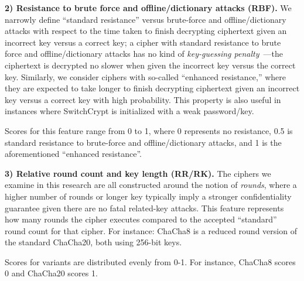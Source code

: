 \textbf{2) Resistance to brute force and offline/dictionary attacks (RBF).} We
narrowly define ``standard resistance'' versus brute-force and
offline/dictionary attacks with respect to the time taken to finish decrypting
ciphertext given an incorrect key versus a correct key; a cipher with standard
resistance to brute force and offline/dictionary attacks has no kind of
\emph{key-guessing penalty}~\cite{Freestyle}---the ciphertext is decrypted no
slower when given the incorrect key versus the correct key. Similarly, we
consider ciphers with so-called ``enhanced resistance,'' where they are expected
to take longer to finish decrypting ciphertext given an incorrect key versus a
correct key with high probability. This property is also useful in instances
where SwitchCrypt is initialized with a weak password/key.

Scores for this feature range from 0 to 1, where 0 represents no resistance, 0.5
is standard resistance to brute-force and offline/dictionary attacks, and 1 is
the aforementioned ``enhanced resistance''.

\textbf{3) Relative round count and key length (RR/RK).} The ciphers we examine
in this research are all constructed around the notion of \emph{rounds}, where a
higher number of rounds or longer key typically imply a stronger confidentiality
guarantee given there are no fatal related-key attacks. This feature represents
how many rounds the cipher executes compared to the accepted ``standard'' round
count for that cipher. For instance: ChaCha8 is a reduced round version of the
standard ChaCha20, both using 256-bit keys.

Scores for variants are distributed evenly from 0-1. For instance, ChaCha8
scores 0 and ChaCha20 scores 1\@.

